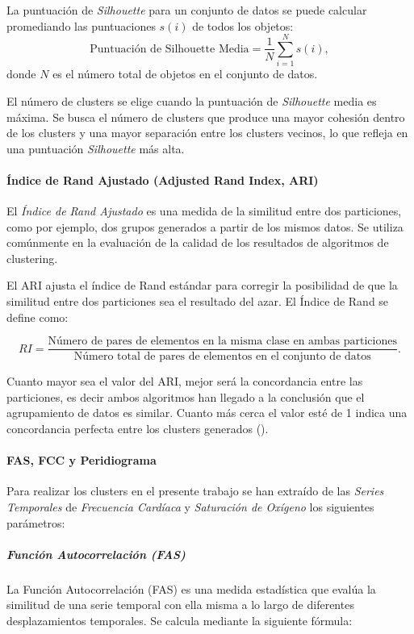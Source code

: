 La puntuación de \textit{Silhouette} para un conjunto de datos se puede calcular promediando las puntuaciones $s(i)$ de todos los objetos:
\[ \text{Puntuación de Silhouette Media} = \frac{1}{N} \sum_{i=1}^{N} s(i), \]
donde \(N\) es el número total de objetos en el conjunto de datos.

El número de clusters se elige cuando la puntuación de \textit{Silhouette} media es máxima. Se busca el número de clusters que produce una mayor cohesión dentro de los clusters y una mayor
separación entre los clusters vecinos, lo que refleja en una puntuación \textit{Silhouette} más alta.

\paragraph{Índice de Rand Ajustado (Adjusted Rand Index, ARI)}\label{sec:ari}

El \textit{Índice de Rand Ajustado} es una medida de la similitud entre dos particiones, como por ejemplo, dos grupos generados a partir de los mismos datos. Se utiliza comúnmente en la evaluación de la calidad de los resultados de algoritmos de clustering. 

El ARI ajusta el índice de Rand estándar para corregir la posibilidad de que la similitud entre dos particiones sea el resultado del azar. El Índice de Rand se define como: 

\[ RI = \frac{\text{Número de pares de elementos en la misma clase en ambas particiones}}{\text{Número total de pares de elementos en el conjunto de datos}} .\]

Cuanto mayor sea el valor del ARI, mejor será la concordancia entre las particiones, es decir ambos algoritmos han llegado a la conclusión que el agrupamiento de datos es similar. Cuanto más cerca el valor esté de 1 indica una concordancia perfecta entre los clusters generados (\cite{rand1971objective}).

\paragraph{FAS, FCC y Peridiograma}\label{sec:FAS-fcc-peridiograma}

Para realizar los clusters en el presente trabajo se han extraído de las \textit{Series Temporales} de \textit{Frecuencia Cardíaca} y \textit{Saturación de Oxígeno} los siguientes parámetros:

\subparagraph{Función Autocorrelación (FAS)}

La Función Autocorrelación (FAS) es una medida estadística que evalúa la similitud de una serie temporal con ella misma a lo largo de diferentes desplazamientos temporales. Se calcula mediante la siguiente fórmula:

